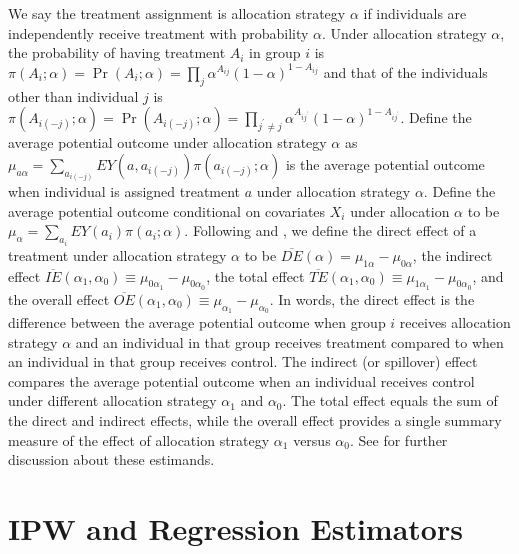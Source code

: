 \documentclass[oupdraft]{biostatistics}
\begin{document}
We say the treatment assignment is allocation strategy $\alpha$ if individuals are independently  receive treatment with probability $\alpha$. Under allocation strategy $\alpha$, the probability of having treatment $A_i$ in group $i$ is $\pi(A_i;\alpha)=\Pr(A_i;\alpha)=\prod_{j} \alpha^{A_{ij}}(1-\alpha)^{1-A_{ij}}$ and that of the individuals other than individual $j$ is $\pi(A_{i(-j)};\alpha)=\Pr(A_{i(-j)};\alpha)=\prod_{j^{'}\neq j} \alpha^{A_{ij^{'}}}(1-\alpha)^{1-A_{ij^{'}}}$.
Define the average potential outcome under allocation strategy $\alpha$ as $ \mu_{a\alpha}= \sum_{a_{i(-j)}}E Y(a,a_{i(-j)})\pi(a_{i(-j)};\alpha)$ is the average potential outcome when individual is assigned treatment $a$ under allocation strategy $\alpha$. Define the average potential outcome conditional on covariates $X_i$ under allocation $\alpha$ to be $\mu_{\alpha}= \sum_{a_i}EY(a_i)\pi(a_i;\alpha)$. Following \citet{halloran1995causal} and \citet{hudgens2008toward}, we define the direct effect of a treatment under allocation strategy $\alpha$ to be $\overline{DE}(\alpha)=\mu_{1\alpha}-\mu_{0\alpha}$, the indirect effect
$\overline{IE}(\alpha_1,\alpha_0)\equiv \mu_{0\alpha_1}-\mu_{0\alpha_0}$, the total effect
$\overline{TE}(\alpha_1,\alpha_0)\equiv  \mu_{1\alpha_1}-\mu_{0\alpha_0}$, and the overall effect
$\overline{OE}(\alpha_1,\alpha_0)\equiv  \mu_{\alpha_1}-\mu_{\alpha_0}$.
In words, the direct effect is the difference between the average potential outcome when group $i$ receives allocation strategy $\alpha$ and an individual in that group receives treatment compared to when an individual in that group receives control. The indirect (or spillover) effect compares the average potential outcome when an individual receives control under different allocation strategy $\alpha_1$ and $\alpha_0$. The total effect equals
the sum of the direct and indirect effects,
while the overall effect provides a single summary measure of the effect of allocation strategy $\alpha_1$ versus $\alpha_0$.
See \citet{tchetgen2012causal} for further discussion about these estimands.
\section{IPW and Regression Estimators}\label{subsec: IPW_and_reg_estimator}
\end{document}
